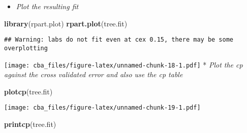 \documentclass[]{article}
\newenvironment{Shaded}{\begin{snugshade}}{\end{snugshade}}
\newcommand{\KeywordTok}[1]{\textcolor[rgb]{0.13,0.29,0.53}{\textbf{#1}}}
\newcommand{\NormalTok}[1]{#1}
\providecommand{\tightlist}{%
  \setlength{\itemsep}{0pt}\setlength{\parskip}{0pt}}
\begin{document}
\begin{itemize}
\tightlist
\item
  \emph{Plot the resulting fit}
\end{itemize}

\begin{Shaded}
\begin{Highlighting}[]
\KeywordTok{library}\NormalTok{(rpart.plot)}
\KeywordTok{rpart.plot}\NormalTok{(tree.fit)}
\end{Highlighting}
\end{Shaded}

\begin{verbatim}
## Warning: labs do not fit even at cex 0.15, there may be some overplotting
\end{verbatim}

\texttt{[image: cba\_files/figure-latex/unnamed-chunk-18-1.pdf]} *
\emph{Plot the cp against the cross validated error and also use the cp
table}

\begin{Shaded}
\begin{Highlighting}[]
\KeywordTok{plotcp}\NormalTok{(tree.fit)}
\end{Highlighting}
\end{Shaded}

\texttt{[image: cba\_files/figure-latex/unnamed-chunk-19-1.pdf]}

\begin{Shaded}
\begin{Highlighting}[]
\KeywordTok{printcp}\NormalTok{(tree.fit)}
\end{Highlighting}
\end{Shaded}
\end{document}
